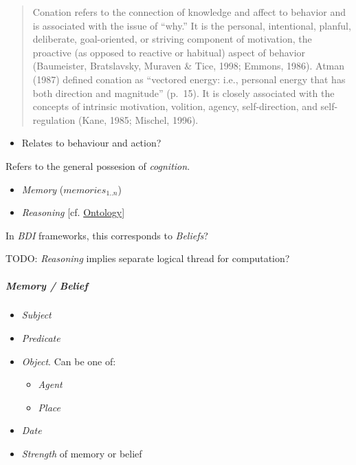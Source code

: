 \documentclass[]{article}
\begin{document}
\begin{quote}
Conation refers to the connection of knowledge and affect to behavior
and is associated with the issue of ``why.'' It is the personal,
intentional, planful, deliberate, goal-oriented, or striving component
of motivation, the proactive (as opposed to reactive or habitual) aspect
of behavior (Baumeister, Bratslavsky, Muraven \& Tice, 1998; Emmons,
1986). Atman (1987) defined conation as ``vectored energy: i.e.,
personal energy that has both direction and magnitude'' (p.~15). It is
closely associated with the concepts of intrinsic motivation, volition,
agency, self-direction, and self-regulation (Kane, 1985; Mischel, 1996).
\end{quote}

\begin{itemize}
\itemsep1pt\parskip0pt
\item
  Relates to behaviour and action?
\end{itemize}


Refers to the general possesion of \emph{cognition}.

\begin{itemize}
\itemsep1pt\parskip0pt
\item
  \emph{Memory} (\(memories_{1..n}\))
\item
  \emph{Reasoning} {[}cf. \hyperref[ontology]{Ontology}{]}
\end{itemize}

In \emph{BDI} frameworks, this corresponds to \emph{Beliefs}?

TODO: \emph{Reasoning} implies separate logical thread for computation?

\subparagraph{Memory / Belief}\label{memory-belief}

\begin{itemize}
\itemsep1pt\parskip0pt
\item
  \emph{Subject}
\item
  \emph{Predicate}
\item
  \emph{Object}. Can be one of:

  \begin{itemize}
  \itemsep1pt\parskip0pt
  \item
    \emph{Agent}
  \item
    \emph{Place}
  \end{itemize}
\item
  \emph{Date}
\item
  \emph{Strength} of memory or belief
\end{itemize}
\end{document}
